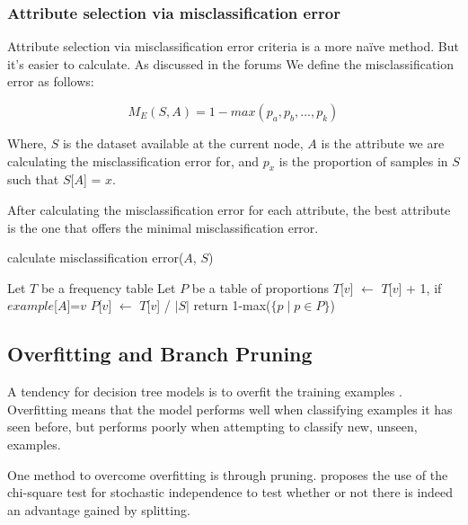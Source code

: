 \documentclass{IEEEtran}
\begin{document}
\subsubsection{Attribute selection via misclassification error}
Attribute selection via misclassification error criteria is a more
na{\"i}ve method. But it's easier to calculate. As discussed in the
forums We define the misclassification error as follows:

\begin{equation}
\label{misclassification-error-equation}
M_E(S,A) = 1 - max(p_a, p_b, ..., p_k) 
\end{equation}

Where, $S$ is the dataset available at the current node, $A$ is the
attribute we are calculating the misclassification error for, and $p_x$
is the proportion of samples in $S$ such that $S$[$A$] = $x$.

After calculating the misclassification error for each attribute, the
best attribute is the one that offers the minimal misclassification
error.

\begin{algorithm}
\caption{calculate misclassification error($A$, $S$)}
\begin{algorithmic}
\Statex {}
\State Let $T$ be a frequency table
\State Let $P$ be a table of proportions
    \State $T$[$v$] $\leftarrow$ $T$[$v$] + 1, if $example$[$A$]=$v$
  \EndFor
  \State $P$[$v$] $\leftarrow$ $T$[$v$] / $\lvert S \rvert$
\EndFor
\State return 1-max($\lbrace p \mid p \in P\rbrace$)

\end{algorithmic}
\end{algorithm}

\subsection{Overfitting and Branch Pruning}
A tendency for decision tree models is to overfit the training
examples \parencite{mitchell1997machine}. Overfitting means that the
model performs well when classifying examples it has seen before, but
performs poorly when attempting to classify new, unseen, examples.

One method to overcome overfitting is through
pruning. \parencite{quinlan1986induction} proposes the use of the
chi-square test for stochastic independence to test whether or not
there is indeed an advantage gained by splitting.
\end{document}

